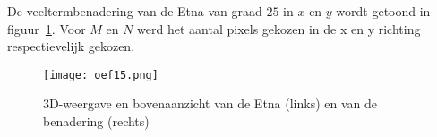 De veeltermbenadering van de Etna van graad $25$ in $x$ en $y$ wordt getoond in figuur~\ref{fig:oef15}. Voor $M$ en $N$ werd het aantal pixels gekozen in de x en y richting respectievelijk gekozen.

\begin{figure}[H]
    \centering
    \texttt{[image: oef15.png]}
    \caption{3D-weergave en bovenaanzicht van de Etna (links) en van de benadering (rechts)}
    \label{fig:oef15}
\end{figure}